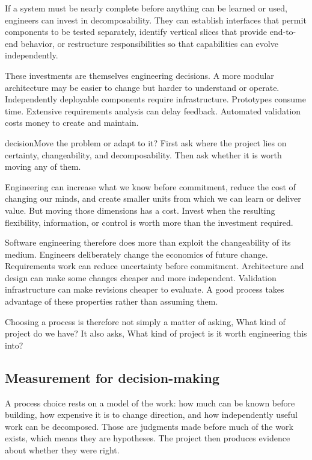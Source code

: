 If a system must be nearly complete before anything can be learned or used, engineers can invest in
decomposability. They can establish interfaces that permit components to be tested separately, identify
vertical slices that provide end-to-end behavior, or restructure responsibilities so that capabilities
can evolve independently.

These investments are themselves engineering decisions. A more modular architecture may be easier to
change but harder to understand or operate. Independently deployable components require infrastructure.
Prototypes consume time. Extensive requirements analysis can delay feedback. Automated validation costs
money to create and maintain.

\begin{bookbox}{decision}{Move the problem or adapt to it?} %
First ask where the project lies on certainty, changeability, and decomposability. Then ask whether it is
worth moving any of them.

Engineering can increase what we know before commitment, reduce the cost of changing our minds, and
create smaller units from which we can learn or deliver value. But moving those dimensions has a cost.
Invest when the resulting flexibility, information, or control is worth more than the investment required.
\end{bookbox}

Software engineering therefore does more than exploit the changeability of its medium. Engineers
deliberately change the economics of future change. Requirements work can reduce uncertainty before
commitment. Architecture and design can make some changes cheaper and more independent. Validation
infrastructure can make revisions cheaper to evaluate. A good process takes advantage of these properties
rather than assuming them.

Choosing a process is therefore not simply a matter of asking, What kind of project do we have? It also
asks, What kind of project is it worth engineering this into?

\subsection{Measurement for decision-making}\label{sec-measurement-process}

A process choice rests on a model of the work: how much can be known before building, how expensive it
is to change direction, and how independently useful work can be decomposed. Those are judgments made
before much of the work exists, which means they are hypotheses. The project then produces evidence
about whether they were right.


